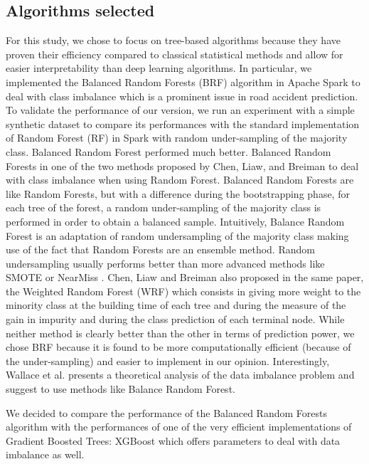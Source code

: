 \documentclass[conference]{IEEEtran}
\begin{document}
\subsection{Algorithms selected}
For this study, we chose to focus on tree-based algorithms because they have proven their efficiency compared to classical statistical methods and allow for easier interpretability than deep learning algorithms. In particular, we implemented the Balanced Random Forests (BRF) algorithm in Apache Spark to deal with class imbalance which is a prominent issue in road accident prediction. To validate the performance of our version, we run an experiment with a simple synthetic dataset to compare its performances with the standard implementation of Random Forest (RF) in Spark with random under-sampling of the majority class. Balanced Random Forest performed much better. Balanced Random Forests in one of the two methods proposed by Chen, Liaw, and Breiman to deal with class imbalance when using Random Forest. Balanced Random Forests are like Random Forests, but with a difference during the bootstrapping phase, for each tree of the forest, a random under-sampling of the majority class is performed in order to obtain a balanced sample. Intuitively, Balance Random Forest is an adaptation of random undersampling of the majority class making use of the fact that Random Forests are an ensemble method. Random undersampling usually performs better than more advanced methods like SMOTE or NearMiss \cite{Branco2016}. Chen, Liaw and Breiman\cite{Chen2004} also proposed in the same paper, the Weighted Random Forest (WRF) which consists in giving more weight to the minority class at the building time of each tree and during the measure of the gain in impurity and during the class prediction of each terminal node. While neither method is clearly better than the other in terms of prediction power, we chose BRF because it is found to be more computationally efficient (because of the under-sampling) and easier to implement in our opinion. Interestingly, Wallace et al. \cite{Wallace2011} presents a theoretical analysis of the data imbalance problem and suggest to use methods like Balance Random Forest. 
	
We decided to compare the performance of the Balanced Random Forests algorithm with the performances of one of the very efficient implementations of Gradient Boosted Trees: XGBoost which offers parameters to deal with data imbalance as well.
\end{document}
